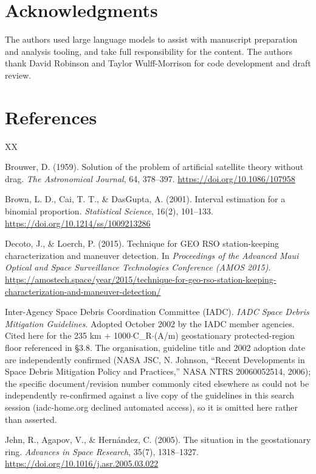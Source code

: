 \documentclass[11pt]{article}
\begin{document}
\section*{Acknowledgments}

The authors used large language models to assist with manuscript preparation and analysis tooling, and take full responsibility for the content. The authors thank David Robinson and Taylor Wulff-Morrison for code development and draft review.

\section*{References}

\begin{thebibliography}{XX}

 Brouwer, D. (1959). Solution of the problem of artificial satellite theory without drag. \emph{The Astronomical Journal}, 64, 378--397. \url{https://doi.org/10.1086/107958}

 Brown, L. D., Cai, T. T., \& DasGupta, A. (2001). Interval estimation for a binomial proportion. \emph{Statistical Science}, 16(2), 101--133. \url{https://doi.org/10.1214/ss/1009213286}

 Decoto, J., \& Loerch, P. (2015). Technique for GEO RSO station-keeping characterization and maneuver detection. In \emph{Proceedings of the Advanced Maui Optical and Space Surveillance Technologies Conference (AMOS 2015)}. \url{https://amostech.space/year/2015/technique-for-geo-rso-station-keeping-characterization-and-maneuver-detection/}

 Inter-Agency Space Debris Coordination Committee (IADC). \emph{IADC Space Debris Mitigation Guidelines}. Adopted October 2002 by the IADC member agencies. Cited here for the 235 km + 1000$\cdot$C\_R$\cdot$(A/m) geostationary protected-region floor referenced in \S{}3.8. The organisation, guideline title and 2002 adoption date are independently confirmed (NASA JSC, N. Johnson, ``Recent Developments in Space Debris Mitigation Policy and Practices,'' NASA NTRS 20060052514, 2006); the specific document/revision number commonly cited elsewhere as  could not be independently re-confirmed against a live copy of the guidelines in this search session (iadc-home.org declined automated access), so it is omitted here rather than asserted.

 Jehn, R., Agapov, V., \& Hern\'andez, C. (2005). The situation in the geostationary ring. \emph{Advances in Space Research}, 35(7), 1318--1327. \url{https://doi.org/10.1016/j.asr.2005.03.022}


\end{thebibliography}
\end{document}
